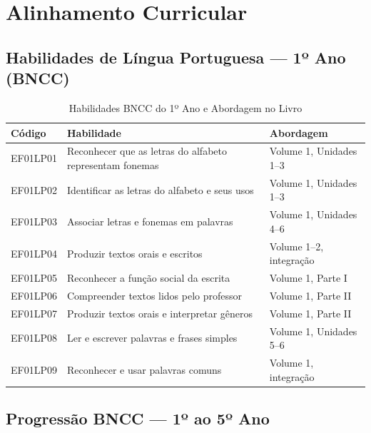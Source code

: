 \chapter{Alinhamento Curricular}

\section{Habilidades de Língua Portuguesa --- 1º Ano (BNCC)}

\begin{table}[h]
\centering
\caption{Habilidades BNCC do 1º Ano e Abordagem no Livro}
\footnotesize
\begin{tabular}{|p{2cm}|p{6cm}|p{4cm}|}
\hline
\textbf{Código} & \textbf{Habilidade} & \textbf{Abordagem} \\
\hline
EF01LP01 & Reconhecer que as letras do alfabeto representam fonemas & Volume 1, Unidades 1--3 \\
\hline
EF01LP02 & Identificar as letras do alfabeto e seus usos & Volume 1, Unidades 1--3 \\
\hline
EF01LP03 & Associar letras e fonemas em palavras & Volume 1, Unidades 4--6 \\
\hline
EF01LP04 & Produzir textos orais e escritos & Volume 1--2, integração \\
\hline
EF01LP05 & Reconhecer a função social da escrita & Volume 1, Parte I \\
\hline
EF01LP06 & Compreender textos lidos pelo professor & Volume 1, Parte II \\
\hline
EF01LP07 & Produzir textos orais e interpretar gêneros & Volume 1, Parte II \\
\hline
EF01LP08 & Ler e escrever palavras e frases simples & Volume 1, Unidades 5--6 \\
\hline
EF01LP09 & Reconhecer e usar palavras comuns & Volume 1, integração \\
\hline
\end{tabular}
\end{table}

\section{Progressão BNCC --- 1º ao 5º Ano}

